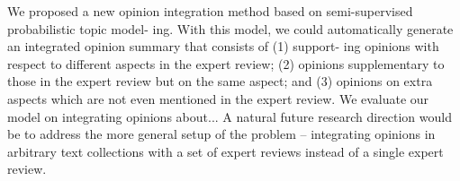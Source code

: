 \documentclass[runningheads,a4paper]{llncs}
\begin{document}
We proposed a new opinion integration method based on semi-supervised probabilistic topic model- ing. With this model, we could automatically generate an integrated opinion summary that consists of (1) support- ing opinions with respect to different aspects in the expert review; (2) opinions supplementary to those in the expert review but on the same aspect; and (3) opinions on extra aspects which are not even mentioned in the expert review. We evaluate our model on integrating opinions about...
A natural future research direction would be to address the more general setup of the problem – integrating opinions in arbitrary text collections with a set of expert reviews instead of a single expert review.



\end{document}
